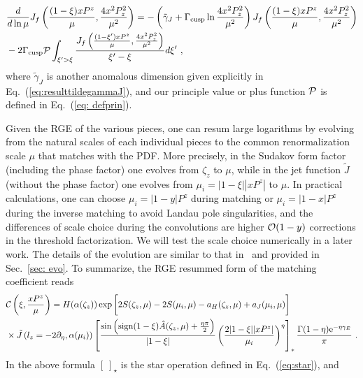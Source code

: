 \documentclass[a4paper,11pt]{article}
\begin{document}
\begin{enumerate}
\begin{align}
&\frac{d}{d\ln \mu} J_{f}\left(\frac{(1-\xi)xP^z}{\mu},\frac{4x^2P_z^2}{\mu^2}\right)=-\left(\tilde \gamma_{J}+\Gamma_{\rm cusp}\ln \frac{4x^2 P_z^2}{\mu^2}\right)J_f\left(\frac{(1-\xi)xP^z}{\mu},\frac{4x^2P_z^2}{\mu^2}\right)
\nonumber \\ 
&-2\Gamma_{\rm cusp}{\cal P}\int_{\xi'>\xi} \frac{J_f\left(\frac{(1-\xi')x P^z}{\mu},\frac{4x^2P_z^2}{\mu^2}\right)}{\xi'-\xi}d\xi' \ ,
\end{align}     
where $\tilde \gamma_J$ is another anomalous dimension given explicitly in Eq.~(\ref{eq:resulttildegammaJ}), and our principle value or plus function ${\cal P}$ is defined in 
Eq.~(\ref{eq: defprin}).
\end{enumerate}

Given the RGE of the various pieces, one can resum large logarithms by evolving from the natural scales of each individual pieces to the common renormalization scale $\mu$ that matches with the PDF.  More precisely, in the Sudakov form factor (including the phase factor) one evolves from $\zeta_z$ to $\mu$, while in the jet function $\tilde J$ (without the phase factor) one evolves from $\mu_i=|1-\xi||xP^z|$ to $\mu$. In practical calculations, one can choose $\mu_i=|1-y| P^z$ during matching or $\mu_i=|1-x| P^z$ during the inverse matching to avoid Landau pole singularities, and the differences of scale choice during the convolutions are higher ${\cal O}(1-y)$ corrections in the threshold factorization. We will test the scale choice numerically in a later work. The details of the evolution are similar to that in~\cite{Becher:2006mr} and provided in Sec.~\ref{sec: evo}.  To summarize, the RGE resummed form of the matching coefficient reads
\begin{align}
&{\cal C}\left(\xi,\frac{xP^z}{\mu}\right)=H(\alpha(\zeta_z))\exp \bigg[2S(\zeta_z,\mu)-2S(\mu_i,\mu)-a_{H}(\zeta_z,\mu)+a_{J}(\mu_i,\mu)\bigg] \nonumber \\
&\times \tilde J\left(l_z=-2 \partial_\eta,\alpha(\mu_i)\right) \left[\frac{\sin \left({\rm sign}(1-\xi)\hat A(\zeta_z,\mu)+\frac{\eta \pi}{2}\right)}{|1-\xi|}\left(\frac{2|1-\xi||xP^z|}{\mu_i}\right)^\eta\right]_{*}\frac{ \Gamma(1-\eta) \mathrm{e}^{-\eta \gamma_E}}{\pi} \ .
\end{align}
In the above formula $[ \ ]_{\star}$ is the star operation defined in Eq.~(\ref{eq:star}), and   
\end{document}
